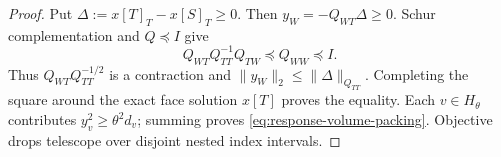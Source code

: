 \begin{proof}
Put $\Delta:=x[T]_T-x[S]_T\geq0$.  Then
$y_W=-Q_{WT}\Delta\geq0$.  Schur complementation and $Q\preceq I$ give
\begin{equation*}
 Q_{WT}Q_{TT}^{-1}Q_{TW}\preceq Q_{WW}\preceq I.
\end{equation*}
Thus $Q_{WT}Q_{TT}^{-1/2}$ is a contraction and
$\|y_W\|_2\leq\|\Delta\|_{Q_{TT}}$.  Completing the square around the exact
face solution $x[T]$ proves the equality.  Each $v\in H_\theta$ contributes
$y_v^2\geq\theta^2d_v$; summing proves
\cref{eq:response-volume-packing}.  Objective drops telescope over disjoint
nested index intervals.
\end{proof}
